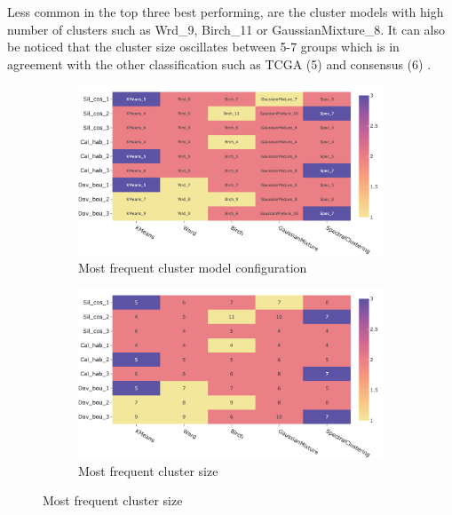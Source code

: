 Less common in the top three best performing, are the cluster models with high number of clusters such as Wrd\_9, Birch\_11 or GaussianMixture\_8. It can also be noticed that the cluster size oscillates between 5-7 groups which is in agreement with the other classification such as TCGA (5) and consensus (6) \citep{Robertson2017-mg,Kamoun2020-tj}.

\begin{figure}[!t]
    \centering
    \small
    \begin{subfigure}[!t]{0.8\textwidth}
        \includegraphics[width=\textwidth]{Sections/ClusteringAnalysis/Resources/cs_top3/top3_cs_gen_top3_heatmap_pca.png}
        \caption{Most frequent cluster model configuration}
        \label{fig:cs:heatmap_gen}
    \end{subfigure}
    \centering
    \begin{subfigure}[!t]{0.8\textwidth}
        \includegraphics[width=\textwidth]{Sections/ClusteringAnalysis/Resources/cs_top3/top3_cs_size_top3_heatmap_pca.png}
        \caption{Most frequent cluster size}
        \label{fig:cs:heatmap_cs}
    \end{subfigure}

\end{figure}
